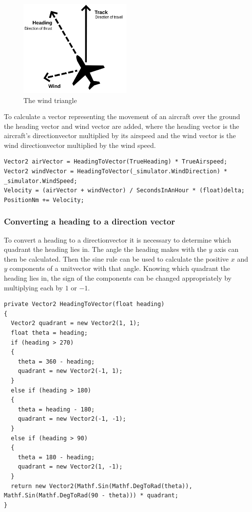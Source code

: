 \documentclass{article}
\begin{document}
\begin{figure}[H]
\centering
\includegraphics[width=0.5\textwidth]{windtriangle.png}
\caption{\label{fig:windtriangle}The wind triangle}
\end{figure}
To calculate a \gls{vector} representing the movement of an aircraft over the ground the heading \gls{vector} and wind \gls{vector} are added, where the \gls{heading} \gls{vector} is the aircraft's \gls{directionvector} multiplied by its \gls{airspeed} and the wind \gls{vector} is the wind \gls{directionvector} multiplied by the wind speed.
\lstset{style=csharp}
\begin{lstlisting}[caption=Extract of the aeroplane physics process]
Vector2 airVector = HeadingToVector(TrueHeading) * TrueAirspeed;
Vector2 windVector = HeadingToVector(_simulator.WindDirection) * _simulator.WindSpeed;
Velocity = (airVector + windVector) / SecondsInAnHour * (float)delta;
PositionNm += Velocity;
\end{lstlisting}

\subsubsection{Converting a heading to a direction vector}
To convert a \gls{heading} to a \gls{directionvector} it is necessary to determine which \gls{quadrant} the \gls{heading} lies in.
The angle the \gls{heading} makes with the $y$ axis can then be calculated.
Then the sine rule can be used to calculate the positive $x$ and $y$ components of a \gls{unitvector} with that angle.
Knowing which \gls{quadrant} the \gls{heading} lies in, the sign of the components can be changed appropriately by multiplying each by $1$ or $-1$.
\lstset{style=csharp}
\begin{lstlisting}[caption=Converting a heading to a vector]
private Vector2 HeadingToVector(float heading)
{
  Vector2 quadrant = new Vector2(1, 1);
  float theta = heading;
  if (heading > 270)
  {
    theta = 360 - heading;
    quadrant = new Vector2(-1, 1);
  }
  else if (heading > 180)
  {
    theta = heading - 180;
    quadrant = new Vector2(-1, -1);
  }
  else if (heading > 90)
  {
    theta = 180 - heading;
    quadrant = new Vector2(1, -1);
  }
  return new Vector2(Mathf.Sin(Mathf.DegToRad(theta)), Mathf.Sin(Mathf.DegToRad(90 - theta))) * quadrant;
}
\end{lstlisting}
\end{document}
